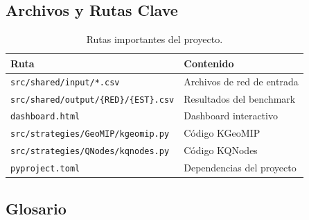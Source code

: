 \subsection{Archivos y Rutas Clave}

\begin{table}[H]
    \centering
    \caption{Rutas importantes del proyecto.}
    \begin{tabular}{ll}
        \toprule
        \textbf{Ruta} & \textbf{Contenido} \\
        \midrule
        \lstinline|src/shared/input/*.csv|             & Archivos de red de entrada \\
        \lstinline|src/shared/output/{RED}/{EST}.csv|  & Resultados del benchmark \\
        \lstinline|dashboard.html|                     & Dashboard interactivo \\
        \lstinline|src/strategies/GeoMIP/kgeomip.py|  & Código KGeoMIP \\
        \lstinline|src/strategies/QNodes/kqnodes.py|  & Código KQNodes \\
        \lstinline|pyproject.toml|                     & Dependencias del proyecto \\
        \bottomrule
    \end{tabular}
\end{table}

\subsection{Glosario}

